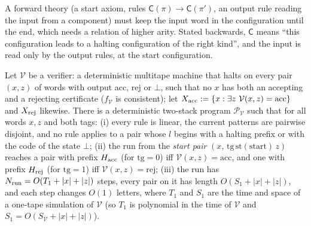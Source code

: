 A forward theory (a start axiom, rules $\mathsf C(\pi)\to\mathsf C(\pi')$, an output rule reading the input from a component) must keep the input word in the configuration until the end, which needs a relation of higher arity. Stated backwards, $\mathsf C$ means ``this configuration leads to a halting configuration of the right kind'', and the input is read only by the output rules, at the start configuration.

\begin{lemma}\label{lem:terms:twostack}
Let $\mathcal V$ be a verifier: a deterministic multitape machine that halts on every pair $(x,z)$ of words with output acc, rej or $\bot$, such that no $x$ has both an accepting and a rejecting certificate ($f_{\mathcal V}$ is consistent); let $X_{\rm acc}:=\{x:\exists z\ \mathcal V(x,z)=\mathrm{acc}\}$ and $X_{\rm rej}$ likewise. There is a deterministic two-stack program $\mathcal P_{\mathcal V}$ such that for all words $x,z$ and both tags:
(i) every rule is linear, the current patterns are pairwise disjoint, and no rule applies to a pair whose $l$ begins with a halting prefix or with the code of the state $\bot$;
(ii) the run from the \emph{start pair} $(x,\,\mathrm{tg}\,\mathrm{st}(\mathrm{start})\,z)$ reaches a pair with prefix $H_{\rm acc}$ (for $\mathrm{tg}=0$) iff $\mathcal V(x,z)=\mathrm{acc}$, and one with prefix $H_{\rm rej}$ (for $\mathrm{tg}=1$) iff $\mathcal V(x,z)=\mathrm{rej}$;
(iii) the run has $N_{\rm run}=O(T_1+\lvert x\rvert+\lvert z\rvert)$ steps, every pair on it has length $O(S_1+\lvert x\rvert+\lvert z\rvert)$, and each step changes $O(1)$ letters, where $T_1$ and $S_1$ are the time and space of a one-tape simulation of $\mathcal V$ (so $T_1$ is polynomial in the time of $\mathcal V$ and $S_1=O(S_{\mathcal V}+\lvert x\rvert+\lvert z\rvert)$).
\end{lemma}

